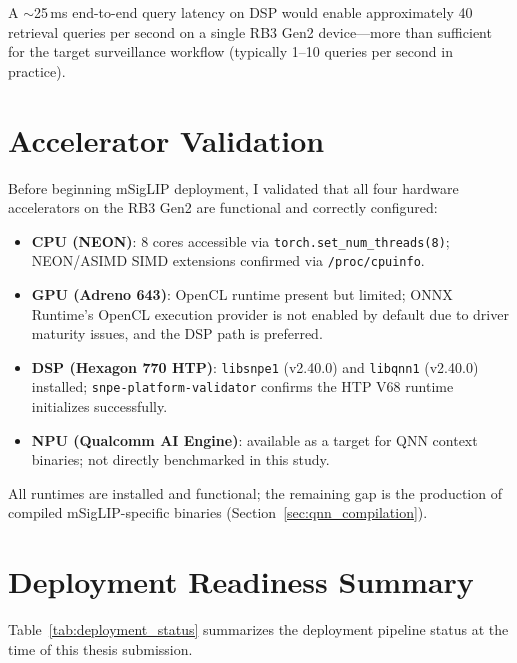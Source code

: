 \documentclass[../main.tex]{subfiles}
\begin{document}
\noindent A $\sim$25\,ms end-to-end query latency on DSP would enable approximately 40 retrieval queries per second on a single RB3 Gen2 device---more than sufficient for the target surveillance workflow (typically 1--10 queries per second in practice).

\section{Accelerator Validation}
\label{sec:accelerator_validation}

\noindent Before beginning mSigLIP deployment, I validated that all four hardware accelerators on the RB3 Gen2 are functional and correctly configured:

\begin{itemize}
    \item \textbf{CPU (NEON)}: 8 cores accessible via \texttt{torch.set\_num\_threads(8)}; NEON/ASIMD SIMD extensions confirmed via \texttt{/proc/cpuinfo}.
    \item \textbf{GPU (Adreno 643)}: OpenCL runtime present but limited; ONNX Runtime's OpenCL execution provider is not enabled by default due to driver maturity issues, and the DSP path is preferred.
    \item \textbf{DSP (Hexagon 770 HTP)}: \texttt{libsnpe1} (v2.40.0) and \texttt{libqnn1} (v2.40.0) installed; \texttt{snpe-platform-validator} confirms the HTP V68 runtime initializes successfully.
    \item \textbf{NPU (Qualcomm AI Engine)}: available as a target for QNN context binaries; not directly benchmarked in this study.
\end{itemize}

\noindent All runtimes are installed and functional; the remaining gap is the production of compiled mSigLIP-specific binaries (Section~\ref{sec:qnn_compilation}).

\section{Deployment Readiness Summary}
\label{sec:deployment_summary}

\noindent Table~\ref{tab:deployment_status} summarizes the deployment pipeline status at the time of this thesis submission.
\end{document}
